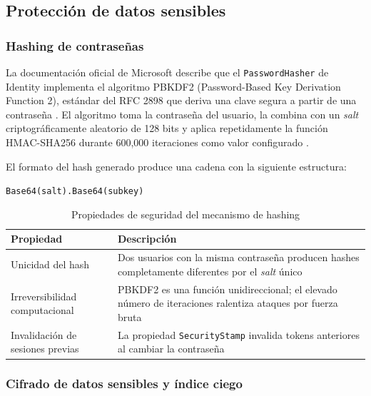\documentclass[12pt,letterpaper]{article}
\begin{document}
\subsection{Protección de datos sensibles}

\subsubsection{Hashing de contraseñas}

La documentación oficial de Microsoft describe que el \texttt{PasswordHasher} de Identity implementa el algoritmo PBKDF2 (Password-Based Key Derivation Function 2), estándar del RFC 2898 que deriva una clave segura a partir de una contraseña \cite{rfc2898}. 
El algoritmo toma la contraseña del usuario, la combina con un \textit{salt} criptográficamente aleatorio de 128 bits y aplica repetidamente la función HMAC-SHA256 durante 600,000 iteraciones como valor configurado \cite{microsoft_password_hasher}.

El formato del hash generado produce una cadena con la siguiente estructura:

\begin{center}
\texttt{Base64(salt).Base64(subkey)}
\end{center}

\begin{table}[H]
\centering
\caption{Propiedades de seguridad del mecanismo de hashing}
\label{tab:hashing-propiedades}
\begin{tabular}{|l|p{10cm}|}
\hline
\textbf{Propiedad} & \textbf{Descripción} \\ \hline
Unicidad del hash & Dos usuarios con la misma contraseña producen hashes completamente diferentes por el \textit{salt} único \\ \hline
Irreversibilidad computacional & PBKDF2 es una función unidireccional; el elevado número de iteraciones ralentiza ataques por fuerza bruta \\ \hline
Invalidación de sesiones previas & La propiedad \texttt{SecurityStamp} invalida tokens anteriores al cambiar la contraseña \\ \hline
\end{tabular}
\end{table}

\subsubsection{Cifrado de datos sensibles y índice ciego}
\end{document}
